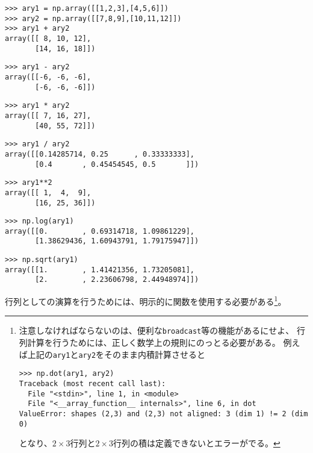 \begin{verbatim}
>>> ary1 = np.array([[1,2,3],[4,5,6]])
>>> ary2 = np.array([[7,8,9],[10,11,12]])
>>> ary1 + ary2
array([[ 8, 10, 12],
       [14, 16, 18]])
\end{verbatim}
\begin{verbatim}
>>> ary1 - ary2
array([[-6, -6, -6],
       [-6, -6, -6]])
\end{verbatim}

\begin{verbatim}
>>> ary1 * ary2
array([[ 7, 16, 27],
       [40, 55, 72]])
\end{verbatim}

\begin{verbatim}
>>> ary1 / ary2
array([[0.14285714, 0.25      , 0.33333333],
       [0.4       , 0.45454545, 0.5       ]])
\end{verbatim}

\begin{verbatim}
>>> ary1**2
array([[ 1,  4,  9],
       [16, 25, 36]])
\end{verbatim}

\begin{verbatim}
>>> np.log(ary1)
array([[0.        , 0.69314718, 1.09861229],
       [1.38629436, 1.60943791, 1.79175947]])
\end{verbatim}

\begin{verbatim}
>>> np.sqrt(ary1)
array([[1.        , 1.41421356, 1.73205081],
       [2.        , 2.23606798, 2.44948974]])
\end{verbatim}

行列としての演算を行うためには、明示的に関数を使用する必要がある\footnote{
注意しなければならないのは、便利な{\tt broadcast}等の機能があるにせよ、
行列計算を行うためには、正しく数学上の規則にのっとる必要がある。
例えば上記の{\tt ary1}と{\tt ary2}をそのまま内積計算させると

\begin{verbatim}
>>> np.dot(ary1, ary2)
Traceback (most recent call last):
  File "<stdin>", line 1, in <module>
  File "<__array_function__ internals>", line 6, in dot
ValueError: shapes (2,3) and (2,3) not aligned: 3 (dim 1) != 2 (dim 0)
\end{verbatim}

となり、$2\times 3$行列と$2\times 3$行列の積は定義できないとエラーがでる。}。

